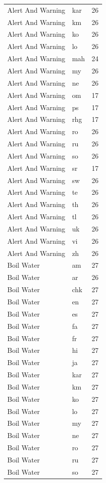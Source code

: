 \begin{longtable}{p{3cm} p{3cm} r}
Alert And Warning & kar & 26 \\
Alert And Warning & km & 26 \\
Alert And Warning & ko & 26 \\
Alert And Warning & lo & 26 \\
Alert And Warning & mah & 24 \\
Alert And Warning & my & 26 \\
Alert And Warning & ne & 26 \\
Alert And Warning & om & 17 \\
Alert And Warning & ps & 17 \\
Alert And Warning & rhg & 17 \\
Alert And Warning & ro & 26 \\
Alert And Warning & ru & 26 \\
Alert And Warning & so & 26 \\
Alert And Warning & sr & 17 \\
Alert And Warning & sw & 26 \\
Alert And Warning & te & 26 \\
Alert And Warning & th & 26 \\
Alert And Warning & tl & 26 \\
Alert And Warning & uk & 26 \\
Alert And Warning & vi & 26 \\
Alert And Warning & zh & 26 \\
Boil Water & am & 27 \\
Boil Water & ar & 26 \\
Boil Water & chk & 27 \\
Boil Water & en & 27 \\
Boil Water & es & 27 \\
Boil Water & fa & 27 \\
Boil Water & fr & 27 \\
Boil Water & hi & 27 \\
Boil Water & ja & 27 \\
Boil Water & kar & 27 \\
Boil Water & km & 27 \\
Boil Water & ko & 27 \\
Boil Water & lo & 27 \\
Boil Water & my & 27 \\
Boil Water & ne & 27 \\
Boil Water & ro & 27 \\
Boil Water & ru & 27 \\
Boil Water & so & 27 \\

\end{longtable}
